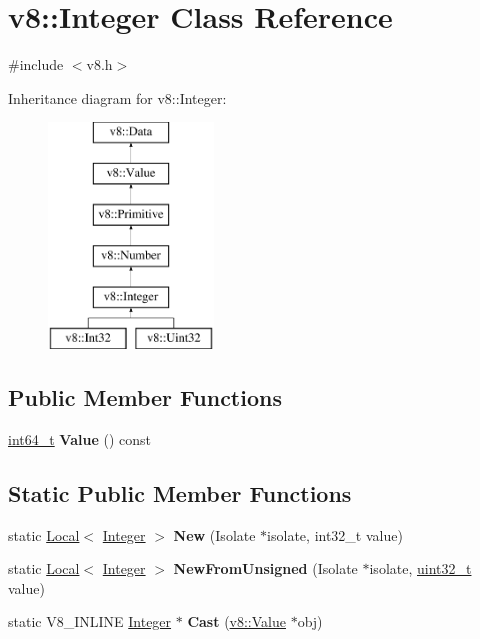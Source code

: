 \hypertarget{classv8_1_1Integer}{}\section{v8\+:\+:Integer Class Reference}
\label{classv8_1_1Integer}


{\ttfamily \#include $<$v8.\+h$>$}

Inheritance diagram for v8\+:\+:Integer\+:\begin{figure}[H]
\begin{center}
\leavevmode
\includegraphics[height=6.000000cm]{classv8_1_1Integer}
\end{center}
\end{figure}
\subsection*{Public Member Functions}
\begin{DoxyCompactItemize}
\item 
\mbox{\label{classv8_1_1Integer_aefa7d26a62f0a59f18b229bf3347fa47}} 
\mbox{\hyperlink{classint64__t}{int64\+\_\+t}} {\bfseries Value} () const
\end{DoxyCompactItemize}
\subsection*{Static Public Member Functions}
\begin{DoxyCompactItemize}
\item 
\mbox{\label{classv8_1_1Integer_acd94a64ebeb75a97c42a20c15738fca4}} 
static \mbox{\hyperlink{classv8_1_1Local}{Local}}$<$ \mbox{\hyperlink{classv8_1_1Integer}{Integer}} $>$ {\bfseries New} (Isolate $\ast$isolate, int32\+\_\+t value)
\item 
\mbox{\label{classv8_1_1Integer_af5543ee5baef2567151d698b06d2087d}} 
static \mbox{\hyperlink{classv8_1_1Local}{Local}}$<$ \mbox{\hyperlink{classv8_1_1Integer}{Integer}} $>$ {\bfseries New\+From\+Unsigned} (Isolate $\ast$isolate, \mbox{\hyperlink{classuint32__t}{uint32\+\_\+t}} value)
\item 
\mbox{\label{classv8_1_1Integer_a886f73d3d8bb91f8235f66d8dccec12a}} 
static V8\+\_\+\+I\+N\+L\+I\+NE \mbox{\hyperlink{classv8_1_1Integer}{Integer}} $\ast$ {\bfseries Cast} (\mbox{\hyperlink{classv8_1_1Value}{v8\+::\+Value}} $\ast$obj)
\end{DoxyCompactItemize}


